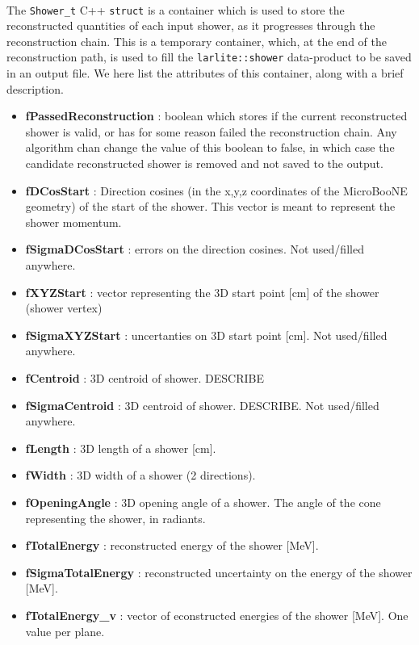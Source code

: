 \paragraph{}The \texttt{Shower\_t} C++ \texttt{struct} is a container which is used to store the reconstructed quantities of each input shower, as it progresses through the reconstruction chain. This is a temporary container, which, at the end of the reconstruction path, is used to fill the \texttt{larlite::shower} data-product to be saved in an output file. We here list the attributes of this container, along with a brief description.
\begin{itemize}
\item \textbf{fPassedReconstruction} : boolean which stores if the current reconstructed shower is valid, or has for some reason failed the reconstruction chain. Any algorithm chan change the value of this boolean to false, in which case the candidate reconstructed shower is removed and not saved to the output.
\item \textbf{fDCosStart} : Direction cosines (in the x,y,z coordinates of the MicroBooNE geometry) of the start of the shower. This vector is meant to represent the shower momentum.
\item \textbf{fSigmaDCosStart} : errors on the direction cosines. {\color{red} Not used/filled anywhere.}
\item \textbf{fXYZStart} : vector representing the 3D start point [cm] of the shower (shower vertex)
\item \textbf{fSigmaXYZStart} : uncertanties on 3D start point [cm]. {\color{red} Not used/filled anywhere.}
\item \textbf{fCentroid} : 3D centroid of shower. {\color{red} DESCRIBE}
\item \textbf{fSigmaCentroid} : 3D centroid of shower. {\color{red} DESCRIBE}. {\color{red} Not used/filled anywhere.}
\item \textbf{fLength} : 3D length of a shower [cm].
\item \textbf{fWidth} : 3D width of a shower (2 directions).
\item \textbf{fOpeningAngle} : 3D opening angle of a shower. The angle of the cone representing the shower, in radiants.
\item \textbf{fTotalEnergy} : reconstructed energy of the shower [MeV].
\item \textbf{fSigmaTotalEnergy} : reconstructed uncertainty on the energy of the shower [MeV].
\item \textbf{fTotalEnergy\_v} : vector of econstructed energies of the shower [MeV]. One value per plane.

\end{itemize}
